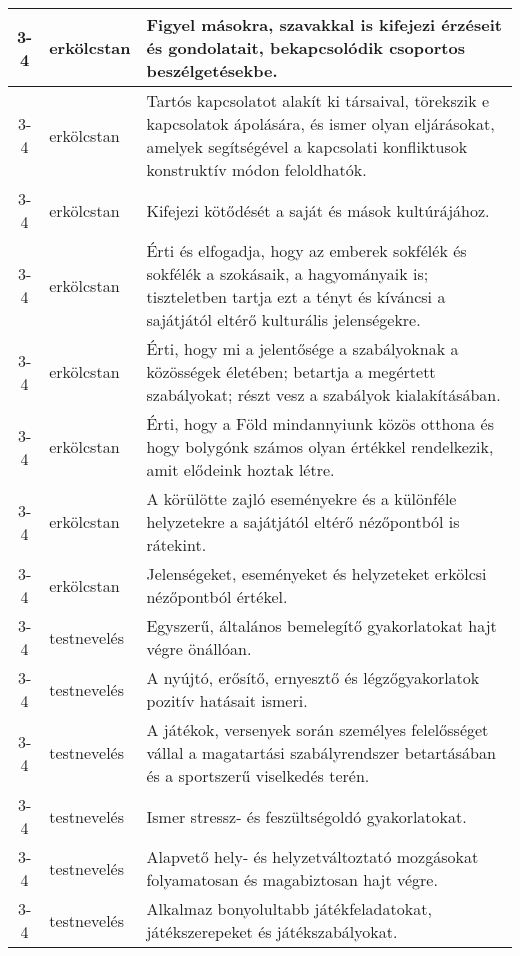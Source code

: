 \begin{small}
\begin{longtable}{c | p{2cm} |  p{11cm} }
              3-4 & erkölcstan & Figyel másokra, szavakkal is kifejezi érzéseit és gondolatait, bekapcsolódik csoportos beszélgetésekbe. \\ \hline
              3-4 & erkölcstan & Tartós kapcsolatot alakít ki társaival, törekszik e kapcsolatok ápolására, és ismer olyan eljárásokat, amelyek segítségével a kapcsolati konfliktusok konstruktív módon feloldhatók. \\ \hline
              3-4 & erkölcstan & Kifejezi kötődését a saját és mások kultúrájához. \\ \hline
              3-4 & erkölcstan & Érti és elfogadja, hogy az emberek sokfélék és sokfélék a szokásaik, a hagyományaik is; tiszteletben tartja ezt a tényt és kíváncsi a sajátjától eltérő kulturális jelenségekre. \\ \hline
              3-4 & erkölcstan & Érti, hogy mi a jelentősége a szabályoknak a közösségek életében; betartja a megértett szabályokat; részt vesz a szabályok kialakításában. \\ \hline
              3-4 & erkölcstan & Érti, hogy a Föld mindannyiunk közös otthona és hogy bolygónk számos olyan értékkel rendelkezik, amit elődeink hoztak létre. \\ \hline
              3-4 & erkölcstan & A körülötte zajló eseményekre és a különféle helyzetekre a sajátjától eltérő nézőpontból is rátekint. \\ \hline
              3-4 & erkölcstan & Jelenségeket, eseményeket és helyzeteket erkölcsi nézőpontból értékel. \\ \hline
              3-4 & testnevelés & Egyszerű, általános bemelegítő gyakorlatokat hajt végre önállóan. \\ \hline
              3-4 & testnevelés & A nyújtó, erősítő, ernyesztő és légzőgyakorlatok pozitív hatásait ismeri. \\ \hline
              3-4 & testnevelés & A játékok, versenyek során személyes felelősséget vállal a magatartási szabályrendszer betartásában és a sportszerű viselkedés terén. \\ \hline
              3-4 & testnevelés & Ismer stressz- és feszültségoldó gyakorlatokat. \\ \hline
              3-4 & testnevelés & Alapvető hely- és helyzetváltoztató mozgásokat folyamatosan és magabiztosan hajt végre. \\ \hline
              3-4 & testnevelés & Alkalmaz bonyolultabb játékfeladatokat, játékszerepeket és játékszabályokat. \\ \hline

\end{longtable}
\end{small}
